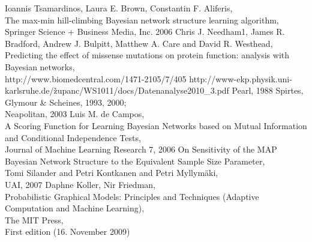 \begin{thebibliography}{56}

Ioannis Tsamardinos, Laura E. Brown, Constantin F. Aliferis,\\
The max-min hill-climbing Bayesian network structure learning algorithm,\\
Springer Science + Business Media,
Inc. 2006
Chris J. Needham1, James R. Bradford, Andrew J. Bulpitt, Matthew A. Care and David R. Westhead,\\
Predicting the effect of missense mutations on protein function: analysis with Bayesian networks,\\
http://www.biomedcentral.com/1471-2105/7/405
http://www-ekp.physik.uni-karlsruhe.de/\~zupanc/WS1011/docs/Datenanalyse2010\_3.pdf
Pearl,
1988
Spirtes, Glymour \& Scheines,
1993, 2000; \\
Neapolitan,
2003
Luis M. de Campos,\\
A Scoring Function for Learning Bayesian Networks based on Mutual
Information and Conditional Independence Tests,\\
Journal of Machine Learning Research 7, 2006
On Sensitivity of the MAP Bayesian Network Structure to the Equivalent Sample Size Parameter,\\
Tomi Silander and Petri Kontkanen and Petri Myllymäki,\\
UAI, 2007
Daphne Koller, Nir Friedman,\\
Probabilistic Graphical Models: Principles and Techniques (Adaptive Computation and Machine Learning),\\
The MIT Press,\\
First edition (16. November 2009)

\end{thebibliography}




			
			
			
			
			
			
			
			
			
			
			
			
			
			
			
			
			



			
			
			
			